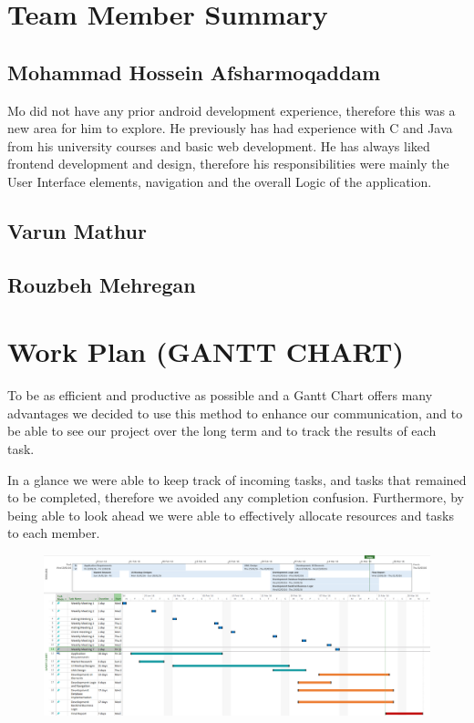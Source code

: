 \documentclass[12pt]{article}
\begin{document}
\newpage
\section{Team Member Summary}

\subsection{Mohammad Hossein Afsharmoqaddam}
Mo did not have any prior android development experience, therefore this was a new area for him to explore. He previously has had experience with C and Java from his university courses and basic web development. He has always liked frontend development and design, therefore his responsibilities were mainly the User Interface elements, navigation and the overall Logic of the application. 

\subsection{Varun Mathur}


\subsection{Rouzbeh Mehregan}





\newpage
\section{Work Plan (GANTT CHART)}
To be as efficient and productive as possible and a Gantt Chart offers many advantages we decided to use this method to enhance our communication, and to be able to see our project over the long term and to track the results of each task. 
\par
In a glance we were able to keep track of incoming tasks, and tasks that remained to be completed, therefore we avoided any completion confusion. Furthermore, by being able to look ahead we were able to effectively allocate resources and tasks to each member. 

\begin{figure}[h]
\begin{center}
\includegraphics[width=1.0\textwidth]{ArcheoReportGantt}
\end{center}
\end{figure}
\end{document}
